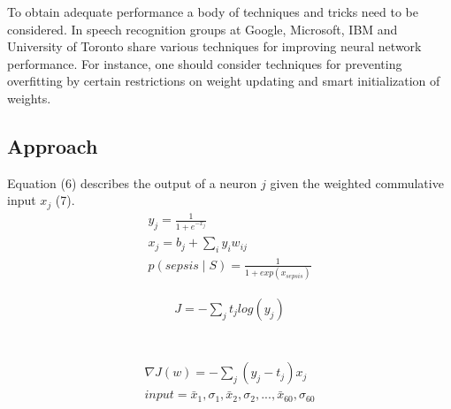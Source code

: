 \documentclass[12pt,solutions]{article}
\begin{document}
To obtain adequate performance a body of techniques and tricks need to be considered. In \cite{hinton2012deep} speech recognition groups at Google, Microsoft, IBM and University of Toronto share various techniques for improving neural network performance. For instance, one should consider techniques for
preventing overfitting by certain restrictions on weight updating and smart initialization of weights.

\subsection{Approach}

Equation (6) describes
the output of a neuron $j$ given the weighted commulative input $x_j$ (7). 
\begin{align}
y_{j} = \frac{1}{1+e^{-x_{j}}} \\
x_{j} = b_{j} + \sum_{i}y_{i}w_{ij} \\
p(sepsis \mid S) = \frac{1}{1 + exp(x_{sepsis})}
\end{align}

\begin{align}
J = -\sum_{j} t_{j} log(y_{j})
\end{align} \\
\\
\begin{align}
\nabla J(w) = -\sum_{j} (y_{j} - t_{j}) x_{j} \\
input = \bar{x}_{1}, \sigma_{1}, \bar{x}_{2}, \sigma_{2}, ... ,\bar{x}_{60}, \sigma_{60}
\end{align} \\
\end{document}
